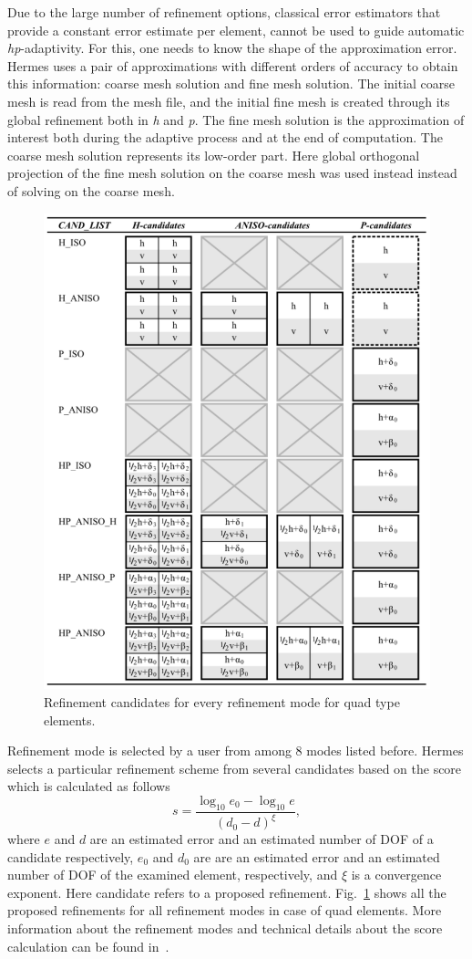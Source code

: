 Due to the large number of refinement options, classical error estimators 
that provide a constant error estimate per element, cannot be used to 
guide automatic \emph{hp}-adaptivity. 
For this, one needs to know the shape of the approximation error.
Hermes uses a pair of approximations with different orders of accuracy 
to obtain this information: coarse mesh solution and fine mesh solution. 
The initial coarse mesh is read from the mesh file, and the initial 
fine mesh is created through its global refinement both in \emph{h}
and \emph{p}. The fine mesh solution is the approximation of 
interest both during the adaptive process and at the end of computation. 
The coarse mesh solution represents its low-order part.
Here global orthogonal projection of the fine mesh solution 
on the coarse mesh was used instead instead of solving on the coarse mesh.

\begin{figure}
  \begin{centering}
  \includegraphics[width=0.5\columnwidth]{cand_list_quads}
  \caption{\label{fig:candlist} Refinement candidates for every
  refinement mode for quad type elements.}
  \end{centering}
\end{figure}
Refinement mode is selected by a user from among 8 modes listed before.
Hermes selects a particular
refinement scheme from several candidates based on the score which is
calculated as follows
\begin{equation}
	s=\frac{\log_{10} e_0 - \log_{10} e}{\left( d_0-d \right)^{\xi}},
\end{equation}
where $e$ and $d$ are an estimated error and an estimated
number of DOF of a candidate respectively, $e_0$ and $d_0$
are are an estimated error and an estimated number of DOF
of the examined element, respectively, and $\xi$ is a
convergence exponent. Here candidate
refers to a proposed refinement. Fig.~\ref{fig:candlist} shows all the proposed
refinements for all refinement modes in case of quad elements.
More information about the refinement modes and technical details
about the score calculation can be found in~\cite{Hermes-project}.


